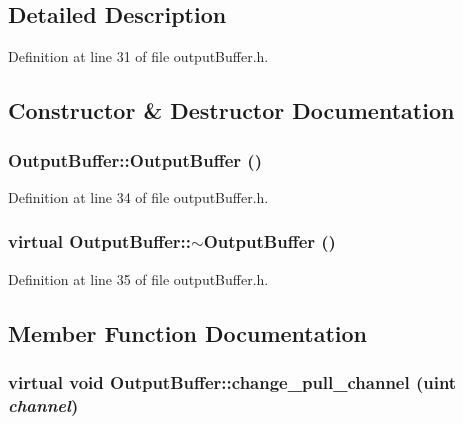 \subsection{Detailed Description}


Definition at line 31 of file outputBuffer.h.

\subsection{Constructor \& Destructor Documentation}
\subsubsection[{OutputBuffer}]{\setlength{\rightskip}{0pt plus 5cm}OutputBuffer::OutputBuffer ()\hspace{0.3cm}{\tt  [inline]}}\label{classOutputBuffer_7a4352dc067a09bf7076bd7f8c6f6e1b}




Definition at line 34 of file outputBuffer.h.
\subsubsection[{$\sim$OutputBuffer}]{\setlength{\rightskip}{0pt plus 5cm}virtual OutputBuffer::$\sim$OutputBuffer ()\hspace{0.3cm}{\tt  [inline, virtual]}}\label{classOutputBuffer_928cc1b1e5cef13f3572c13775d547b5}




Definition at line 35 of file outputBuffer.h.

\subsection{Member Function Documentation}
\subsubsection[{change\_\-pull\_\-channel}]{\setlength{\rightskip}{0pt plus 5cm}virtual void OutputBuffer::change\_\-pull\_\-channel ({\bf uint} {\em channel})\hspace{0.3cm}{\tt  [pure virtual]}}\label{classOutputBuffer_fb8e0a16f34dcff4c0d954201712f762}


